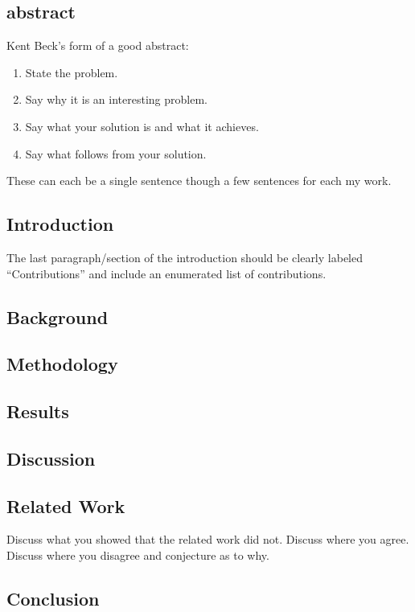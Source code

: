 \subsection{abstract}

Kent Beck's form of a good abstract:

  \begin{enumerate}
  \item{} State the problem.
  \item{} Say why it is an interesting problem.
  \item{} Say what your solution is and what it achieves.
  \item{} Say what follows from your solution.
  \end{enumerate}
  These can each be a single sentence though a few sentences for each my work.

\subsection{Introduction}

  The last paragraph/section of the introduction should be clearly labeled ``Contributions'' and
  include an enumerated list of contributions.

\subsection{Background}

\subsection{Methodology}

\subsection{Results}

\subsection{Discussion}

\subsection{Related Work}

  Discuss what you showed that the related work did not. Discuss where you agree. Discuss where you
  disagree and conjecture as to why.

\subsection{Conclusion}

